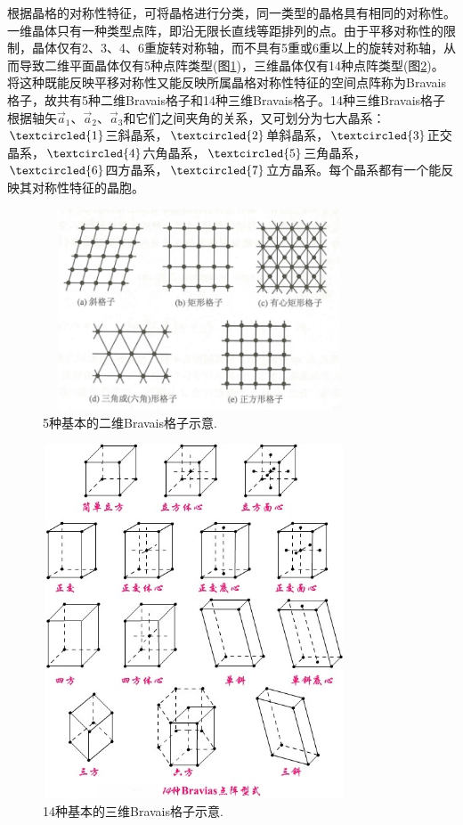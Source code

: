 根据晶格的对称性特征，可将晶格进行分类，同一类型的晶格具有相同的对称性。一维晶体只有一种类型点阵，即沿无限长直线等距排列的点。由于平移对称性的限制，晶体仅有2、3、4、6重旋转对称轴，而不具有5重或6重以上的旋转对称轴，从而导致二维平面晶体仅有5种点阵类型(图\ref{Fig:Lattice_Type-2D})，三维晶体仅有14种点阵类型(图\ref{Fig:Lattice_Type-3D})。将这种既能反映平移对称性又能反映所属晶格对称性特征的空间点阵称为Bravais格子，故共有5种二维Bravais格子和14种三维Bravais格子。14种三维Bravais格子根据轴矢$\vec a_1$、$\vec a_2$、$\vec a_3$和它们之间夹角的关系，又可划分为七大晶系：$\textcircled{1}$三斜晶系，$\textcircled{2}$单斜晶系，$\textcircled{3}$正交晶系，$\textcircled{4}$六角晶系，$\textcircled{5}$三角晶系，$\textcircled{6}$四方晶系，$\textcircled{7}$立方晶系。每个晶系都有一个能反映其对称性特征的晶胞。
\begin{figure}[h!]
\centering
\vspace*{-0.05in}
\includegraphics[height=2.35in,width=3.65in,viewport=0 0 90 60,clip]{Figures/Bravais_Lattice-2D.jpg}
\caption{\small \textrm{5种基本的二维Bravais格子示意.}}%
\label{Fig:Lattice_Type-2D}
\end{figure}

\begin{figure}[h!]
\centering
\vspace*{-0.05in}
\includegraphics[height=4.15in,width=3.55in,viewport=0 25 487 581,clip]{Figures/Bravais_Lattice-3D.jpg}
\caption{\small \textrm{14种基本的三维Bravais格子示意.}}%
\label{Fig:Lattice_Type-3D}
\end{figure}

